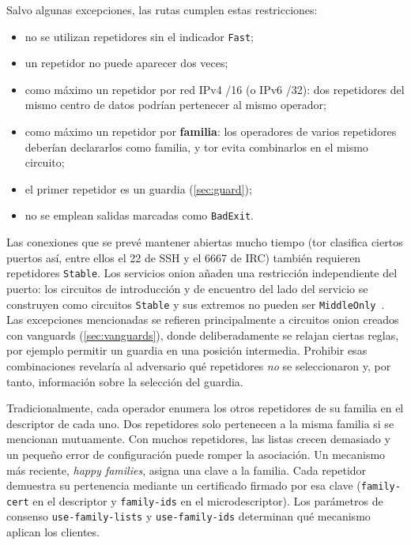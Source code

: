Salvo algunas excepciones, las rutas cumplen estas restricciones:
\begin{itemize}
  \item no se utilizan repetidores sin el indicador \texttt{Fast};
  \item un repetidor no puede aparecer dos veces;
  \item como máximo un repetidor por red IPv4 /16 (o IPv6 /32): dos repetidores del mismo centro de datos podrían pertenecer al mismo operador;
  \item como máximo un repetidor por \textbf{familia}: los operadores de varios repetidores deberían declararlos como familia, y tor evita combinarlos en el mismo circuito;
  \item el primer repetidor es un guardia (\cref{sec:guard});
  \item no se emplean salidas marcadas como \texttt{BadExit}.
\end{itemize}

Las conexiones que se prevé mantener abiertas mucho tiempo (tor clasifica ciertos puertos así, entre ellos el 22 de SSH y el 6667 de IRC) también requieren repetidores \texttt{Stable}. Los servicios onion añaden una restricción independiente del puerto: los circuitos de introducción y de encuentro del lado del servicio se construyen como circuitos \texttt{Stable} y sus extremos no pueden ser \texttt{MiddleOnly}~. Las excepciones mencionadas se refieren principalmente a circuitos onion creados con vanguards (\cref{sec:vanguards}), donde deliberadamente se relajan ciertas reglas, por ejemplo permitir un guardia en una posición intermedia. Prohibir esas combinaciones revelaría al adversario qué repetidores \emph{no} se seleccionaron y, por tanto, información sobre la selección del guardia.

\begin{approfondimento}
Tradicionalmente, cada operador enumera los otros repetidores de su familia en el descriptor de cada uno. Dos repetidores solo pertenecen a la misma familia si se mencionan mutuamente. Con muchos repetidores, las listas crecen demasiado y un pequeño error de configuración puede romper la asociación. Un mecanismo más reciente, \emph{happy families}, asigna una clave a la familia. Cada repetidor demuestra su pertenencia mediante un certificado firmado por esa clave (\texttt{family-cert} en el descriptor y \texttt{family-ids} en el microdescriptor). Los parámetros de consenso \texttt{use-family-lists} y \texttt{use-family-ids} determinan qué mecanismo aplican los clientes.
\end{approfondimento}

